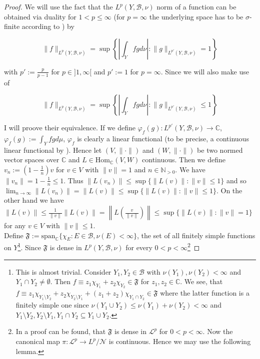 \begin{proof}
	We will use the fact that the $L^p(Y,\mathcal{B},\nu)$ norm of a function can be obtained via duality for $1 < p \leqslant \infty$ (for $p = \infty$ the underlying space has to be $\sigma$-finite according to \cite[288--289]{elstrodt:mass:2011}) by 
	
	\begin{equation*}
		\|f\|_{L^p(Y,\mathcal{B},\nu)} = \sup \left\{ \left\vert \int_Y fgd\nu\right\vert : \|g\|_{L^{p'}(Y,\mathcal{B},\nu)} = 1\right\}
	\end{equation*}

with $p' := \frac{p}{p - 1}$ for $p \in ]1,\infty[$ and $p' := 1$ for $p = \infty$. Since we will also make use of 

	\begin{equation*}
		\|f\|_{L^p(Y,\mathcal{B},\nu)} = \sup \left\{ \left\vert \int_Y fgd\nu\right\vert : \|g\|_{L^{p'}(Y,\mathcal{B},\nu)} \leqslant 1\right\}
	\end{equation*}

	I will proove their equivalence. If we define $\varphi_f(g): L^{p'}(Y,\mathcal{B},\nu) \rightarrow \mathbb{C}$, $\displaystyle \varphi_f(g) := \int_Y fgd\mu$, $\varphi_f$ is clearly a linear functional (to be precise, a continuous linear functional by \cite[289]{elstrodt:mass:2011}). Hence let $(V,\|\cdot\|)$ and $(W,\|\cdot\|)$ be two normed vector spaces over $\mathbb{C}$ and $L \in \mathrm{Hom}_{\mathbb{C}}(V,W)$ continuous. Then we define $v_n := \left( 1 - \frac{1}{n} \right)v$ for $v \in V$ with $\|v\| = 1$ and $n \in \mathbb{N}_{>0}$. We have $\|v_n\| = 1 - \frac{1}{n} \leqslant 1$. Thus $\|L(v_n)\| \leqslant \sup\{\|L(v)\|:\|v\| \leqslant 1\}$ and so $\lim_{n \rightarrow \infty} \|L(v_n)\| = \|L(v)\| \leqslant \sup\{\|L(v)\|:\|v\| \leqslant 1\}$. On the other hand we have $\|L(v)\| \leqslant \frac{1}{\|v\|}\|L(v)\| = \left\| L\left( \frac{v}{\|v\|} \right)\right\| \leqslant \sup\{\|L(v)\|:\|v\| = 1\}$ for any $v \in V$ with $\|v\| \leqslant 1$.\\
	Define $\mathfrak{F} := \mathrm{span}_{\mathbb{C}}\{\chi_E: E \in \mathcal{B},\nu(E) < \infty\}$, the set of all finitely simple functions on $Y$\footnote{
		This is almost trivial. Consider $Y_1,Y_2 \in \mathcal{B}$ with $\nu(Y_1),\nu(Y_2) < \infty$ and $Y_1 \cap Y_2 \neq \emptyset$. Then $f \equiv z_1\chi_{Y_1} + z_2\chi_{Y_2} \in \mathfrak{F}$ for $z_1,z_2 \in \mathbb{C}$. We see, that $f \equiv z_1 \chi_{Y_1\setminus Y_2} + z_2 \chi_{Y_2\setminus Y_1} + (z_1 + z_2)\chi_{Y_1 \cap Y_2} \in \mathfrak{F}$ where the latter function is a finitely simple one since $\nu(Y_1 \cup Y_2) \leqslant \nu(Y_1) + \nu(Y_2) < \infty$ and $Y_1\setminus Y_2,Y_2 \setminus Y_1, Y_1 \cap Y_2 \subseteq Y_1 \cup Y_2$.	
	}. Since $\mathfrak{F}$ is dense in $L^p(Y,\mathcal{B},\nu)$ for every $0 < p < \infty$\footnote{
		In \cite[242]{elstrodt:mass:2011} a proof can be found, that $\mathfrak{F}$ is dense in $\mathcal{L}^p$ for $0< p < \infty$. Now the canonical map $\pi: \mathcal{L}^p \rightarrow L^p/\mathcal{N}$ is continuous. Hence we may use the following lemma.

}
\end{proof}
